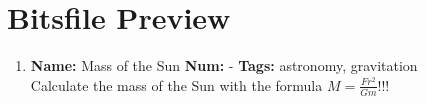 \documentclass{article}
\begin{document}
\section*{Bitsfile Preview}

\begin{enumerate}
  \item
    {\small\textbf{Name:} Mass of the Sun\quad
    \textbf{Num:} -\quad
    \textbf{Tags:} astronomy, gravitation}\\[4pt]
    Calculate the mass of the Sun with the formula $M=\frac{Fr^2}{Gm}$!!!
\end{enumerate}
\end{document}
